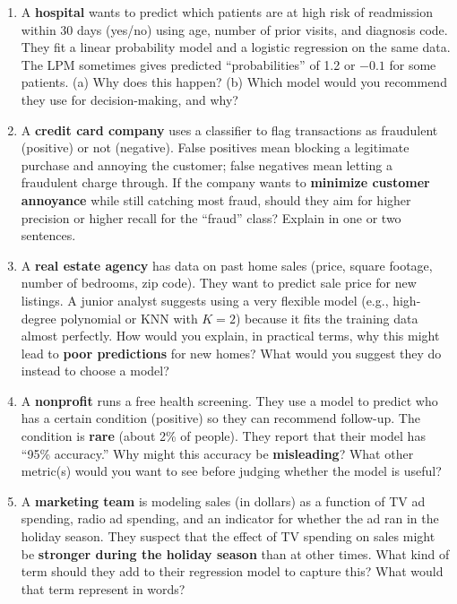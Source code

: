 \documentclass[11pt]{article}
\begin{document}
\begin{enumerate}[leftmargin=*, resume]

\item A \textbf{hospital} wants to predict which patients are at high risk of readmission within 30 days (yes/no) using age, number of prior visits, and diagnosis code. They fit a linear probability model and a logistic regression on the same data. The LPM sometimes gives predicted “probabilities” of 1.2 or $-0.1$ for some patients. (a) Why does this happen? (b) Which model would you recommend they use for decision-making, and why?

\item A \textbf{credit card company} uses a classifier to flag transactions as fraudulent (positive) or not (negative). False positives mean blocking a legitimate purchase and annoying the customer; false negatives mean letting a fraudulent charge through. If the company wants to \textbf{minimize customer annoyance} while still catching most fraud, should they aim for higher precision or higher recall for the “fraud” class? Explain in one or two sentences.

\item A \textbf{real estate agency} has data on past home sales (price, square footage, number of bedrooms, zip code). They want to predict sale price for new listings. A junior analyst suggests using a very flexible model (e.g., high-degree polynomial or KNN with $K=2$) because it fits the training data almost perfectly. How would you explain, in practical terms, why this might lead to \textbf{poor predictions} for new homes? What would you suggest they do instead to choose a model?

\item A \textbf{nonprofit} runs a free health screening. They use a model to predict who has a certain condition (positive) so they can recommend follow-up. The condition is \textbf{rare} (about 2\% of people). They report that their model has “95\% accuracy.” Why might this accuracy be \textbf{misleading}? What other metric(s) would you want to see before judging whether the model is useful?

\item A \textbf{marketing team} is modeling sales (in dollars) as a function of TV ad spending, radio ad spending, and an indicator for whether the ad ran in the holiday season. They suspect that the effect of TV spending on sales might be \textbf{stronger during the holiday season} than at other times. What kind of term should they add to their regression model to capture this? What would that term represent in words?


\end{enumerate}
\end{document}
